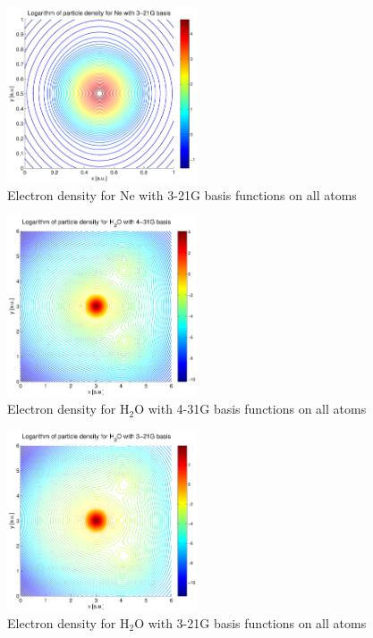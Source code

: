 \documentclass[a4paper,10pt, twocolumn, pre]{revtex4}
\begin{document}
\begin{figure}[h!tb]
\includegraphics[width=0.5\textwidth]{./figures/Nedensity_321g.pdf}
\caption{Electron density for Ne with 3-21G basis functions on all atoms}
\end{figure}

\begin{figure}[h!tb]
\includegraphics[width=0.5\textwidth]{./figures/H2Odensity_431g.pdf}
\caption{Electron density for H$_2$O with 4-31G basis functions on all atoms}
\end{figure}
\begin{figure}[h!tb]
\includegraphics[width=0.5\textwidth]{./figures/H2Odensity_321g.pdf}
\caption{Electron density for H$_2$O with 3-21G basis functions on all atoms}
\end{figure}
\end{document}
